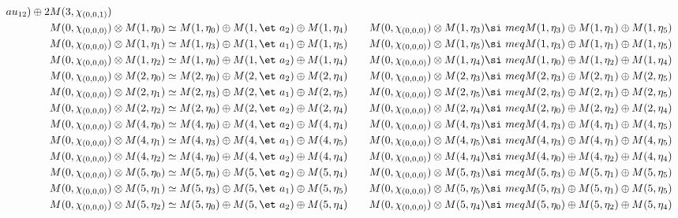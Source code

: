 \begin{align*}
au_{12}) \oplus 2 M(3,\chi_{(0,0,1)})\\
M(0,\chi_{(0,0,0)}) &\otimes M(1,\eta_{0}) \simeq M(1,\eta_{0}) \oplus M(1,\et\
a_{2}) \oplus M(1,\eta_{4}) &&& M(0,\chi_{(0,0,0)}) &\otimes M(1,\eta_{3}) \si\
meq M(1,\eta_{3}) \oplus M(1,\eta_{1}) \oplus M(1,\eta_{5})\\
M(0,\chi_{(0,0,0)}) &\otimes M(1,\eta_{1}) \simeq M(1,\eta_{3}) \oplus M(1,\et\
a_{1}) \oplus M(1,\eta_{5}) &&& M(0,\chi_{(0,0,0)}) &\otimes M(1,\eta_{5}) \si\
meq M(1,\eta_{3}) \oplus M(1,\eta_{1}) \oplus M(1,\eta_{5})\\
M(0,\chi_{(0,0,0)}) &\otimes M(1,\eta_{2}) \simeq M(1,\eta_{0}) \oplus M(1,\et\
a_{2}) \oplus M(1,\eta_{4}) &&& M(0,\chi_{(0,0,0)}) &\otimes M(1,\eta_{4}) \si\
meq M(1,\eta_{0}) \oplus M(1,\eta_{2}) \oplus M(1,\eta_{4})\\
M(0,\chi_{(0,0,0)}) &\otimes M(2,\eta_{0}) \simeq M(2,\eta_{0}) \oplus M(2,\et\
a_{2}) \oplus M(2,\eta_{4}) &&& M(0,\chi_{(0,0,0)}) &\otimes M(2,\eta_{3}) \si\
meq M(2,\eta_{3}) \oplus M(2,\eta_{1}) \oplus M(2,\eta_{5})\\
M(0,\chi_{(0,0,0)}) &\otimes M(2,\eta_{1}) \simeq M(2,\eta_{3}) \oplus M(2,\et\
a_{1}) \oplus M(2,\eta_{5}) &&& M(0,\chi_{(0,0,0)}) &\otimes M(2,\eta_{5}) \si\
meq M(2,\eta_{3}) \oplus M(2,\eta_{1}) \oplus M(2,\eta_{5})\\
M(0,\chi_{(0,0,0)}) &\otimes M(2,\eta_{2}) \simeq M(2,\eta_{0}) \oplus M(2,\et\
a_{2}) \oplus M(2,\eta_{4}) &&& M(0,\chi_{(0,0,0)}) &\otimes M(2,\eta_{4}) \si\
meq M(2,\eta_{0}) \oplus M(2,\eta_{2}) \oplus M(2,\eta_{4})\\
M(0,\chi_{(0,0,0)}) &\otimes M(4,\eta_{0}) \simeq M(4,\eta_{0}) \oplus M(4,\et\
a_{2}) \oplus M(4,\eta_{4}) &&& M(0,\chi_{(0,0,0)}) &\otimes M(4,\eta_{3}) \si\
meq M(4,\eta_{3}) \oplus M(4,\eta_{1}) \oplus M(4,\eta_{5})\\
M(0,\chi_{(0,0,0)}) &\otimes M(4,\eta_{1}) \simeq M(4,\eta_{3}) \oplus M(4,\et\
a_{1}) \oplus M(4,\eta_{5}) &&& M(0,\chi_{(0,0,0)}) &\otimes M(4,\eta_{5}) \si\
meq M(4,\eta_{3}) \oplus M(4,\eta_{1}) \oplus M(4,\eta_{5})\\
M(0,\chi_{(0,0,0)}) &\otimes M(4,\eta_{2}) \simeq M(4,\eta_{0}) \oplus M(4,\et\
a_{2}) \oplus M(4,\eta_{4}) &&& M(0,\chi_{(0,0,0)}) &\otimes M(4,\eta_{4}) \si\
meq M(4,\eta_{0}) \oplus M(4,\eta_{2}) \oplus M(4,\eta_{4})\\
M(0,\chi_{(0,0,0)}) &\otimes M(5,\eta_{0}) \simeq M(5,\eta_{0}) \oplus M(5,\et\
a_{2}) \oplus M(5,\eta_{4}) &&& M(0,\chi_{(0,0,0)}) &\otimes M(5,\eta_{3}) \si\
meq M(5,\eta_{3}) \oplus M(5,\eta_{1}) \oplus M(5,\eta_{5})\\
M(0,\chi_{(0,0,0)}) &\otimes M(5,\eta_{1}) \simeq M(5,\eta_{3}) \oplus M(5,\et\
a_{1}) \oplus M(5,\eta_{5}) &&& M(0,\chi_{(0,0,0)}) &\otimes M(5,\eta_{5}) \si\
meq M(5,\eta_{3}) \oplus M(5,\eta_{1}) \oplus M(5,\eta_{5})\\
M(0,\chi_{(0,0,0)}) &\otimes M(5,\eta_{2}) \simeq M(5,\eta_{0}) \oplus M(5,\et\
a_{2}) \oplus M(5,\eta_{4}) &&& M(0,\chi_{(0,0,0)}) &\otimes M(5,\eta_{4}) \si\
meq M(5,\eta_{0}) \oplus M(5,\eta_{2}) \oplus M(5,\eta_{4})\\
\end{align*}

